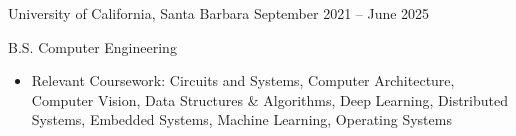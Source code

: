 \documentclass[9pt]{developercv} %
\begin{document}
\begin{entrylist}
    \vspace{-4pt}
    \entry
		{}
		{University of California, Santa Barbara}
		{September 2021 – June 2025}
		{B.S. Computer Engineering
        \begin{itemize}[noitemsep,topsep=0pt,parsep=0pt,partopsep=0pt, leftmargin=10pt]
            \item Relevant Coursework: Circuits and Systems, Computer Architecture, Computer Vision, Data Structures \& Algorithms, Deep Learning, Distributed Systems, Embedded Systems, Machine Learning, Operating Systems
        \end{itemize}}
\end{entrylist}
\vspace{-10pt}
\end{document}
